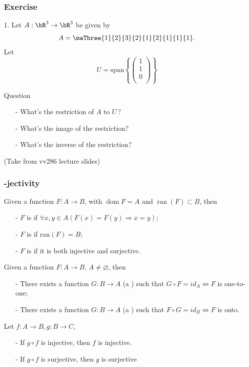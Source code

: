 \documentclass{beamer}
\begin{document}
\begin{frame}
    \frametitle{Exercise}
    1. Let $A: \bR^3 \to \bR^3 $ be given by
    $$A=\maThree{1}{2}{3}{2}{1}{2}{1}{1}{1}.$$
    Let 
    $$U=\text{span} {\left \{\begin{pmatrix}1\\1\\0\\\end{pmatrix}\right \} }$$
    \begin{block}{Question}
        \begin{itemize}
            \item[-]What's the restriction of $A$ to $U\,$? 
            \item[-]What's the image of the restriction?
            \item[-]What's the inverse of the restriction? 
        \end{itemize}
    \end{block}
    (Take from vv286 lecture slides)
\end{frame}
\begin{frame}
    \frametitle{-jectivity}
    \parbox{\textwidth}{
		\par Given a function $F : A \to B$, with $\operatorname{dom} F = A$ and $ \operatorname{ran}(F) \subset B$, then
		\begin{itemize}
			\item[-] $F$ is  if $\forall x, y \in A(F(x) = F(y) \Rightarrow x = y)$;
			\item[-] $F$ is  if ran$(F) = B$;
			\item[-] $F$ is  if it is both injective and surjective.
		\end{itemize}
		\vs{0.3em}
		\par Given a function $F : A \to B$, $A \neq \varnothing$, then
		\begin{itemize}
			\item[-] There exists a function $G : B \to A$ (a ) such that
			$G \circ F = id_A \Leftrightarrow F$ is one-to-one;
			\item[-] There exists a function $G : B \to A$ (a ) such that
			$F \circ G = id_B \Leftrightarrow F$ is onto.
		\end{itemize}
        \begin{block}{Let $f : A \to B, g : B \to C$,}
            \begin{itemize}
                \item[-] If $g \circ f$ is injective, then $f$ is injective.
                \item[-] If $g \circ f$ is surjective, then $g$ is surjective
            \end{itemize}
        \end{block}
	}
\end{frame}
\end{document}
